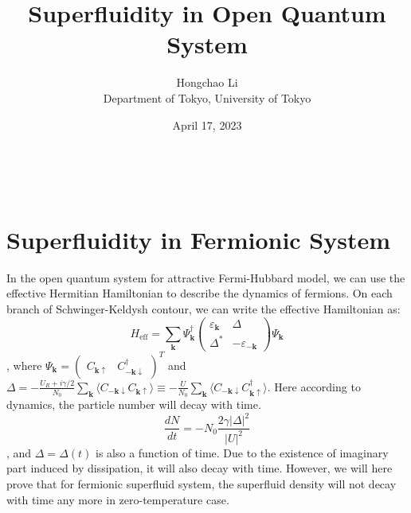 \documentclass{article}
\newcommand{\tmaffiliation}[1]{\\ #1}
\newcommand{\tmmathbf}[1]{\ensuremath{\boldsymbol{#1}}}
\newcommand{\tmop}[1]{\ensuremath{\operatorname{#1}}}
\newcommand{\tmstrong}[1]{\textbf{#1}}
\begin{document}
\title{Superfluidity in Open Quantum System}

\author{
  {\tmstrong{}}Hongchao Li
  \tmaffiliation{Department of Tokyo, University of Tokyo}
}

\date{April 17, 2023}

\maketitle

{\tableofcontents}

\

\section{Superfluidity in Fermionic System}

In the open quantum system for attractive Fermi-Hubbard model, we can use the
effective Hermitian Hamiltonian to describe the dynamics of fermions. On each
branch of Schwinger-Keldysh contour, we can write the effective Hamiltonian
as:
\begin{equation}
  H_{\tmop{eff}} = \sum_{\tmmathbf{k}} \Psi_{\tmmathbf{k}}^{\dagger}
  \left(\begin{array}{cc}
    \varepsilon_{\tmmathbf{k}} & \Delta\\
    \Delta^{\ast} & - \varepsilon_{-\tmmathbf{k}}
  \end{array}\right) \Psi_{\tmmathbf{k}}
\end{equation}
, where $\Psi_{\tmmathbf{k}} = \left(\begin{array}{cc}
  C_{\tmmathbf{k} \uparrow} & C^{\dagger}_{-\tmmathbf{k} \downarrow}
\end{array}\right)^T$ and $\Delta = - \frac{U_R + i \gamma / 2}{N_0}
\sum_{\tmmathbf{k}} \langle C_{-\tmmathbf{k} \downarrow} C_{\tmmathbf{k}
\uparrow} \rangle \equiv - \frac{U}{N_0} \sum_{\tmmathbf{k}} \langle
C_{-\tmmathbf{k} \downarrow} C_{\tmmathbf{k} \uparrow}^{\dagger} \rangle$.
Here according to dynamics, the particle number will decay with time.
\begin{equation}
  \frac{d N}{d t} = - N_0 \frac{2 \gamma | \Delta |^2}{| U |^2}
\end{equation}
, and $\Delta = \Delta (t)$ is also a function of time. Due to the existence
of imaginary part induced by dissipation, it will also decay with time.
However, we will here prove that for fermionic superfluid system, the
superfluid density will not decay with time any more in zero-temperature case.
\end{document}

